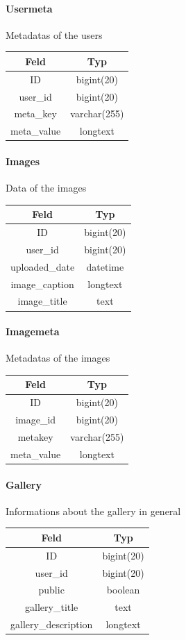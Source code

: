 \documentclass[a4paper,12pt,oneside]{article} %
\begin{document}
\paragraph*{Usermeta}

Metadatas of the users

\begin{tabular}{|c|c|}
\hline 
Feld & Typ\tabularnewline
\hline 
\hline 
ID & bigint(20)\tabularnewline
\hline 
user\_id & bigint(20)\tabularnewline
\hline 
meta\_key & varchar(255)\tabularnewline
\hline 
meta\_value & longtext\tabularnewline
\hline 
\end{tabular}

\paragraph*{Images}

Data of the images
\begin{tabular}{|c|c|}
\hline 
Feld & Typ\tabularnewline
\hline 
\hline 
ID & bigint(20)\tabularnewline
\hline 
user\_id & bigint(20)\tabularnewline
\hline 
uploaded\_date & datetime\tabularnewline
\hline 
image\_caption & longtext\tabularnewline
\hline 
image\_title & text\tabularnewline
\end{tabular}

\paragraph*{Imagemeta}

Metadatas of the images

\begin{tabular}{|c|c|}
\hline 
Feld & Typ\tabularnewline
\hline 
\hline 
ID & bigint(20)\tabularnewline
\hline 
image\_id & bigint(20)\tabularnewline
\hline 
metakey & varchar(255)\tabularnewline
\hline 
meta\_value & longtext\tabularnewline
\end{tabular}

\paragraph*{Gallery}

Informations about the gallery in general

\begin{tabular}{|c|c|}
\hline 
Feld & Typ\tabularnewline
\hline 
\hline 
ID & bigint(20)\tabularnewline
\hline 
user\_id & bigint(20)\tabularnewline
\hline 
public & boolean\tabularnewline
\hline 
gallery\_title & text\tabularnewline
\hline 
gallery\_description & longtext\tabularnewline
\end{tabular}
\end{document}
